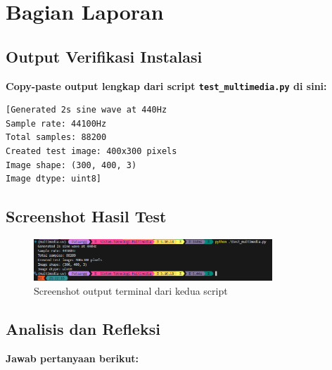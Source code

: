 \documentclass[11pt,a4paper]{article}
\begin{document}
\section{Bagian Laporan}

\subsection{Output Verifikasi Instalasi}
\textbf{Copy-paste output lengkap dari script \texttt{test\_multimedia.py} di sini:}

\begin{lstlisting}[caption=Output verifikasi instalasi]
[Generated 2s sine wave at 440Hz
Sample rate: 44100Hz
Total samples: 88200
Created test image: 400x300 pixels
Image shape: (300, 400, 3)
Image dtype: uint8]
\end{lstlisting}

\subsection{Screenshot Hasil Test}
\begin{itemize}
    \begin{figure}[H]
        \centering
        \includegraphics[width=0.8\textwidth]{Figure/img7.png}
        \caption{Screenshot output terminal dari kedua script}
        \vspace{0.1cm}
    \end{figure}
\end{itemize}

\subsection{Analisis dan Refleksi}
\textbf{Jawab pertanyaan berikut:}
\end{document}
